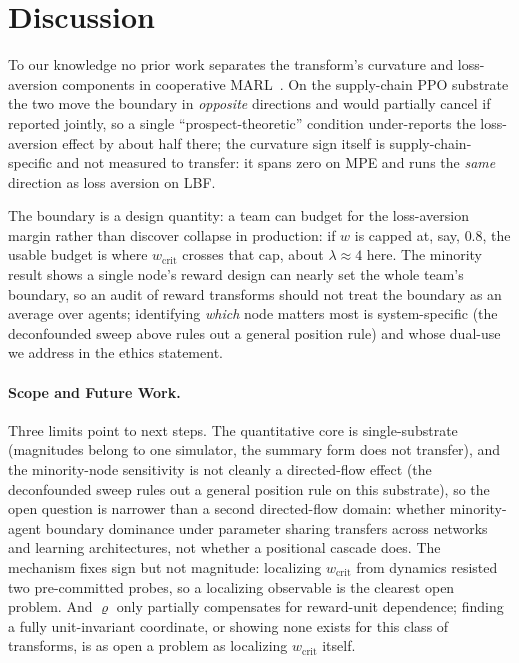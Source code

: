 \documentclass[letterpaper]{article} %
\theoremstyle{plain}
\newcommand{\wcrit}{w_{\mathrm{crit}}}
\begin{document}
\section{Discussion}
\label{sec:discussion}

To our knowledge no prior work separates the transform's curvature and loss-aversion components in
cooperative MARL~\citep{lalmohammed2025,ghaemi2024risk}. On the supply-chain PPO substrate the two move
the boundary in \emph{opposite} directions and would partially cancel if reported jointly, so a single
``prospect-theoretic'' condition under-reports the loss-aversion effect by about half there; the
curvature sign itself is supply-chain-specific and not measured to transfer: it spans zero on MPE and
runs the \emph{same} direction as loss aversion on LBF.

The boundary is a design quantity: a team can budget for the loss-aversion margin rather than discover
collapse in production: if $w$ is capped at, say, $0.8$, the usable budget is where $\wcrit$ crosses
that cap, about $\lambda\approx4$ here. The minority result shows a single node's reward design can
nearly set the whole team's boundary, so an audit of reward transforms should not treat the boundary as
an average over agents; identifying \emph{which} node matters most is system-specific (the deconfounded
sweep above rules out a general position rule) and whose dual-use we address in the ethics statement.

\paragraph{Scope and Future Work.}
Three limits point to next steps. The quantitative core is single-substrate (magnitudes belong to one
simulator, the summary form does not transfer), and the minority-node sensitivity is not cleanly a
directed-flow effect (the deconfounded sweep rules out a general position rule on this substrate), so
the open question is narrower than a second directed-flow domain: whether minority-agent boundary
dominance under parameter sharing transfers across networks and learning architectures, not whether a
positional cascade does. The mechanism fixes sign but not magnitude: localizing $\wcrit$ from
dynamics resisted two pre-committed probes, so a localizing observable is the clearest
open problem. And $\varrho$ only partially compensates for reward-unit dependence; finding a fully
unit-invariant coordinate, or showing none exists for this class of transforms, is as open a problem
as localizing $\wcrit$ itself.
\end{document}
